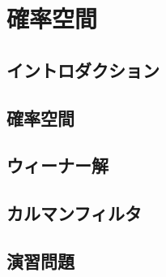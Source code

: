 \documentclass[../../main]{subfiles}
\begin{document}
\chapter{確率空間}
\label{chapter:probability_space}

\section{イントロダクション}

\section{確率空間}

\section{ウィーナー解}

\section{カルマンフィルタ}

\section{演習問題}
\end{document}

